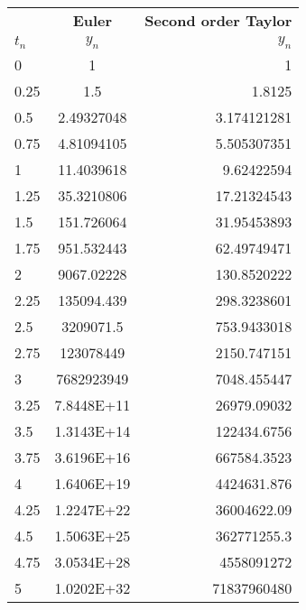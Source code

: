\documentclass{article}
\begin{document}
\begin{table}[ht]
  \begin{center}
    \label{tab:table 2.c}
    \begin{tabular}{|l|c|r|} %
    \hline
     &\textbf{Euler}&\textbf{Second order Taylor}\\
    $t_n$&$y_n$&$y_n$\\
    \hline
    0&1&1\\
    0.25&1.5&1.8125\\
    0.5&2.49327048&3.174121281\\
    0.75&4.81094105&5.505307351\\
    1&11.4039618&9.62422594\\
    1.25&35.3210806&17.21324543\\
    1.5&151.726064&31.95453893\\
    1.75&951.532443&62.49749471\\
    2&9067.02228&130.8520222\\
    2.25&135094.439&298.3238601\\
    2.5&3209071.5&753.9433018\\
    2.75&123078449&2150.747151\\
    3&7682923949&7048.455447\\
    3.25&7.8448E+11&26979.09032\\
    3.5&1.3143E+14&122434.6756\\
    3.75&3.6196E+16&667584.3523\\
    4&1.6406E+19&4424631.876\\
    4.25&1.2247E+22&36004622.09\\
    4.5&1.5063E+25&362771255.3\\
    4.75&3.0534E+28&4558091272\\
    5&1.0202E+32&71837960480\\
    \hline
    \end{tabular}
  \end{center}
\end{table}
\end{document}
